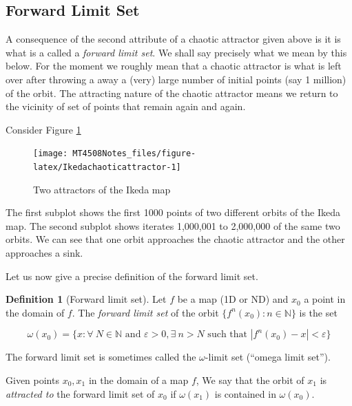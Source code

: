 \documentclass[
  a4paper,
  oneside,
  final]{krantz}
\newcommand{\N}{\mathbb{N}}
\renewcommand{\epsilon}{\varepsilon}
\theoremstyle{definition}
\newtheorem{definition}{Definition}[chapter]
\theoremstyle{definition}
\theoremstyle{definition}
\theoremstyle{definition}
\theoremstyle{remark}
\begin{document}
\hypertarget{Forward-limit-set}{%
\subsection{Forward Limit Set}\label{Forward-limit-set}}

A consequence of the second attribute of a chaotic attractor given above is it is what is a called a \emph{forward limit set}. We shall say precisely what we mean by this below. For the moment we roughly mean that a chaotic attractor is what is left over after throwing a away a (very) large number of initial points (say 1 million) of the orbit. The attracting nature of the chaotic attractor means we return to the vicinity of set of points that remain again and again.

Consider Figure \ref{fig:Ikedachaoticattractor}

\begin{figure}

{\centering \texttt{[image: MT4508Notes\_files/figure-latex/Ikedachaoticattractor-1]} 

}

\caption{Two attractors of the Ikeda map}\label{fig:Ikedachaoticattractor}
\end{figure}

The first subplot shows the first 1000 points of two different orbits of the Ikeda map. The second subplot shows iterates 1,000,001 to 2,000,000 of the same two orbits. We can see that one orbit approaches the chaotic attractor and the other approaches a sink.

Let us now give a precise definition of the forward limit set.

\begin{definition}[Forward limit set]
\protect\hypertarget{def:forward-limit-set}{}\label{def:forward-limit-set}Let \(f\) be a map (1D or ND) and \(x_0\) a point in the domain of \(f\). The \emph{forward limit set} of the orbit \(\{ f^{n}(x_0): n \in \N \}\) is the set

\[ \omega(x_0) = \{x: \forall \ N \in \N \text{ and } \epsilon >0, \exists \ n>N \text{ such that } |f^{n}(x_0) - x |< \epsilon \}\]
\end{definition}

The forward limit set is sometimes called the \(\omega\)-limit set (``omega limit set'').

Given points \(x_0, x_1\) in the domain of a map \(f\), We say that the orbit of \(x_1\) is \emph{attracted to} the forward limit set of \(x_0\) if \(\omega(x_1)\) is contained in \(\omega(x_0)\).
\end{document}
